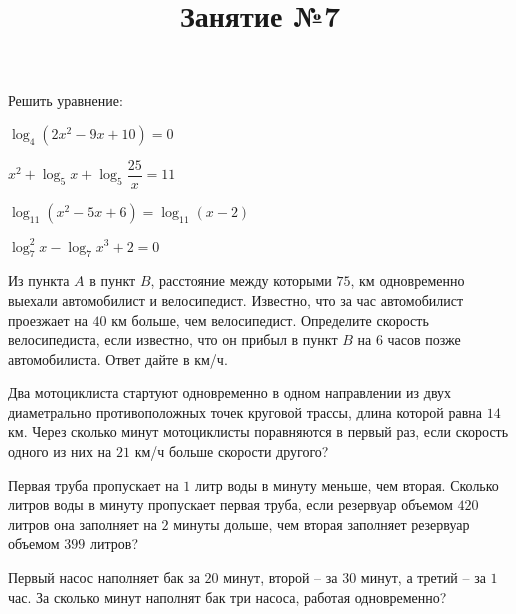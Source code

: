 \begin{listofex}
	\item Решить уравнение:
	\begin{enumcols}[itemcolumns=2]
		\item \( \log_4(2x^2-9x+10)=0 \)
		\item \( x^2+\log_5 x + \log_5\dfrac{25}{x}=11 \)
		\item \( \log_{11}(x^2-5x+6)=\log_{11}(x-2) \)
		\item \( \log^2_7 x - \log_7 x^3 + 2 = 0 \)
	\end{enumcols}
	\item Из пункта \( A \) в пункт \( B \), расстояние между которыми \(75\), км одновременно выехали автомобилист и велосипедист. Известно, что за час автомобилист проезжает на \(40\) км больше, чем велосипедист. Определите скорость велосипедиста, если известно, что он прибыл в пункт \(B\) на \(6\) часов позже автомобилиста. Ответ дайте в км/ч.
	\item Два мотоциклиста стартуют одновременно в одном направлении из двух диаметрально противоположных точек круговой трассы, длина которой равна \( 14  \) км. Через сколько минут мотоциклисты поравняются в первый раз, если скорость одного из них на \( 21  \) км/ч больше скорости другого?
	\item Первая труба пропускает на \(1\) литр воды в минуту меньше, чем вторая. Сколько литров воды в минуту пропускает первая труба, если резервуар объемом \(420\) литров она заполняет на \( 2 \) минуты дольше, чем вторая заполняет резервуар объемом \(399\) литров?
	\item Первый насос наполняет бак за \( 20 \) минут, второй – за \( 30 \) минут, а третий – за \( 1 \) час. За сколько минут наполнят бак три насоса, работая одновременно?
\end{listofex}
\newpage
\title{Занятие №7}
